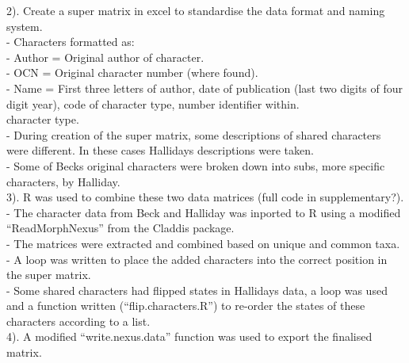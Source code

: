 \documentclass[a4paper,11pt]{article}
\begin{document}
2). Create a super matrix in excel to standardise the data format and naming system.\\ %
 - Characters formatted as: \\
 - Author = Original author of character.\\
 - OCN = Original character number (where found).\\ %
 - Name = First three letters of author, date of publication (last two digits of four digit year), code of character type, number identifier within.\\ character type. \\ 
 - During creation of the super matrix, some descriptions of shared characters were different. In these cases Hallidays descriptions were taken.\\
 - Some of Becks original characters were broken %
  down into subs, more specific characters, by Halliday.\\

3). R was used to combine these two data matrices (full code in supplementary?).\\ %
 - The character data from Beck and Halliday was inported to R using a modified ``ReadMorphNexus'' from the Claddis package.\\
 - The matrices were extracted and combined based on unique and common taxa.\\
 - A loop was written to place the added characters into the correct position in the super matrix.\\
 - Some shared characters had flipped states in Hallidays data, a loop was used and a function written (``flip.characters.R'') to re-order the states of these characters according to a list.\\

 4). A modified ``write.nexus.data'' function was used to export the finalised matrix.\\
\end{document}

